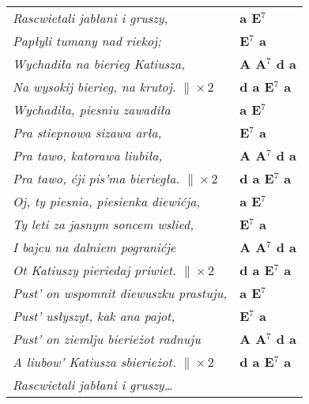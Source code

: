 {\small 
	\begin{tabular}{@{\hspace{3mm}}l@{\hspace{8mm}}>{\bfseries}l}
		\textit{Rascwietali jabłani i gruszy,} & a E$^7$ \\
		\textit{Papłyli tumany nad riekoj; }& E$^7$ a \\
		\textit{Wychadiła na bierieg Katiusza,} & A A$^7$ d a \\
		\textit{Na wysokij bierieg, na krutoj.} $\| \times 2$ & d a E$^7$ a \\[1mm]
		
		\textit{Wychadiła, piesniu zawadiła} & a E$^7$ \\
		\textit{Pra stiepnowa sizawa arła,} & E$^7$ a \\
		\textit{Pra tawo, katorawa liubiła,} & A A$^7$ d a \\
		\textit{Pra tawo, ćji pis'ma bieriegła.} $\| \times 2$ & d a E$^7$ a \\[1mm]
		
		\textit{Oj, ty piesnia, piesienka diewićja,} & a E$^7$ \\
		\textit{Ty leti za jasnym soncem wslied,} & E$^7$ a \\
		\textit{I bajcu na dalniem pogranićje} & A A$^7$ d a \\
		\textit{Ot Katiuszy pieriedaj priwiet.} $\| \times 2$ & d a E$^7$ a \\[1mm]
		
		\textit{Pust' on wspomnit diewuszku prastuju,} & a E$^7$ \\
		\textit{Pust' usłyszyt, kak ana pajot,} & E$^7$ a \\
		\textit{Pust' on ziemlju bierieżot radnuju} & A A$^7$ d a \\
		\textit{A liubow' Katiusza sbierieżot.} $\| \times 2$ & d a E$^7$ a \\[1mm]
		
		\textit{Rascwietali jabłani i gruszy\ldots} \\
		
	\end{tabular}

 }